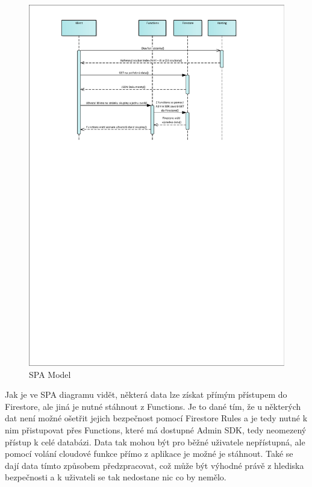 \begin{figure}[H]
    \includegraphics[width=\textwidth]{pdf/SPA-model}
    \caption{SPA Model} \label{picture:recipeo:spa-model}
\end{figure}

Jak je ve SPA diagramu vidět, některá data lze získat přímým přístupem do Firestore, ale jiná je nutné stáhnout z Functions.
Je to dané tím, že u některých dat není možné ošetřit jejich bezpečnost pomocí Firestore Rules a je tedy nutné k nim přistupovat
přes Functions, které má dostupné Admin SDK, tedy neomezený přístup k celé databázi. Data tak mohou být pro běžné uživatele nepřístupná,
ale pomocí volání cloudové funkce přímo z aplikace je možné je stáhnout. Také se dají data tímto způsobem předzpracovat, což může
být výhodné právě z hlediska bezpečnosti a k uživateli se tak nedostane nic co by nemělo.

